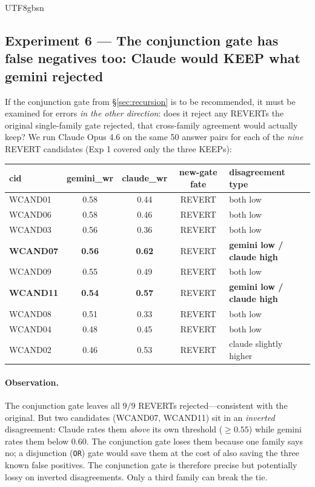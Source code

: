 \documentclass{article}
\begin{document}
\begin{CJK*}{UTF8}{gbsn}
\subsection{Experiment 6 — The conjunction gate has false
negatives too: Claude would KEEP what gemini rejected}
\label{sec:exp6}

If the conjunction gate from \S\ref{sec:recursion} is to be
recommended, it must be examined for errors \emph{in the other
direction}: does it reject any REVERTs the original single-family
gate rejected, that cross-family agreement would actually keep? We
run Claude Opus 4.6 on the same 50 answer pairs for each of the
\emph{nine} REVERT candidates (Exp 1 covered only the three KEEPs):

\begin{center}\small
\begin{tabular}{l c c c l}
  \toprule
  cid & gemini\_wr & claude\_wr & new-gate fate
    & disagreement type \\
  \midrule
  WCAND01 & 0.58 & 0.44 & REVERT & both low \\
  WCAND06 & 0.58 & 0.46 & REVERT & both low \\
  WCAND03 & 0.56 & 0.36 & REVERT & both low \\
  \textbf{WCAND07} & \textbf{0.56} & \textbf{0.62} & REVERT
    & \textbf{gemini low / claude high} \\
  WCAND09 & 0.55 & 0.49 & REVERT & both low \\
  \textbf{WCAND11} & \textbf{0.54} & \textbf{0.57} & REVERT
    & \textbf{gemini low / claude high} \\
  WCAND08 & 0.51 & 0.33 & REVERT & both low \\
  WCAND04 & 0.48 & 0.45 & REVERT & both low \\
  WCAND02 & 0.46 & 0.53 & REVERT & claude slightly higher \\
  \bottomrule
\end{tabular}
\end{center}

\paragraph{Observation.} The conjunction gate leaves all
\(9/9\) REVERTs rejected—consistent with the original. But
two candidates (WCAND07, WCAND11) sit in an \emph{inverted}
disagreement: Claude rates them \emph{above} its own threshold
(\(\geq 0.55\)) while gemini rates them below \(0.60\). The
conjunction gate loses them because one family says no; a
disjunction (\texttt{OR}) gate would save them at the cost of
also saving the three known false positives. The conjunction
gate is therefore precise but potentially lossy on inverted
disagreements. Only a third family can break the tie.


\end{CJK*}
\end{document}
